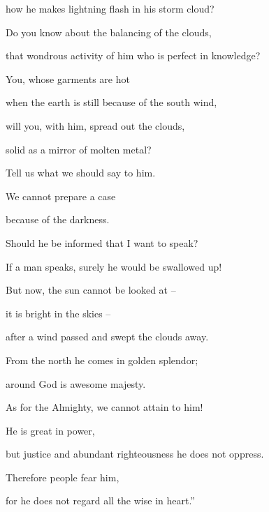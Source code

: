 {\par }{\Q how he makes
lightning
flash
in his storm cloud?
\par }{\Q {}Do you know
about the balancing
of the clouds,
\par }{\Q that wondrous activity
of him who is perfect
in knowledge?
\par }{\Q {}You, whose
garments
are hot
\par }{\Q when the earth
is still because of the south wind,
\par }{\Q {}will you, with him,
spread
out the clouds,
\par }{\Q solid
as a mirror
of molten metal?
\par }{\Q {}Tell
us what
we should say
to him.
\par }{\Q We cannot
prepare
a case

\par }{\Q because
of the darkness.
\par }{\Q {}Should
he be informed
that
I want to speak?
\par }{\Q If
a man
speaks, surely
he would be swallowed up!
\par }{\Q {}But now,
the sun
cannot
be looked at –
\par }{\Q it is bright in the skies –
\par }{\Q after a wind passed and swept the clouds away.
\par }{\Q {}From the north
he comes
in golden splendor;
\par }{\Q around
God
is awesome
majesty.
\par }{\Q {}As for the Almighty,
we cannot
attain
to him!
\par }{\Q He is great in power,
\par }{\Q but justice
and abundant
righteousness
he does not
oppress.
\par }{\Q {}Therefore
people
fear
him,
\par }{\Q for he does not
regard
all
the wise
in heart.”

}
